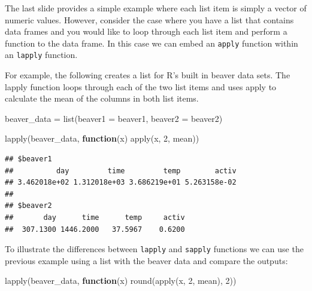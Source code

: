 \documentclass[
]{book}
\newenvironment{Shaded}{\begin{snugshade}}{\end{snugshade}}
\newcommand{\AttributeTok}[1]{\textcolor[rgb]{0.77,0.63,0.00}{#1}}
\newcommand{\ControlFlowTok}[1]{\textcolor[rgb]{0.13,0.29,0.53}{\textbf{#1}}}
\newcommand{\DecValTok}[1]{\textcolor[rgb]{0.00,0.00,0.81}{#1}}
\newcommand{\FunctionTok}[1]{\textcolor[rgb]{0.00,0.00,0.00}{#1}}
\newcommand{\NormalTok}[1]{#1}
\newcommand{\OtherTok}[1]{\textcolor[rgb]{0.56,0.35,0.01}{#1}}
\begin{document}
The last slide provides a simple example where each list item is simply a vector of numeric values. However, consider the case where you have a list that contains data frames and you would like to loop through each list item and perform a function to the data frame. In this case we can embed an \texttt{apply} function within an \texttt{lapply} function.

For example, the following creates a list for R's built in beaver data sets. The lapply function loops through each of the two list items and uses apply to calculate the mean of the columns in both list items.

\begin{Shaded}
\begin{Highlighting}[]
\NormalTok{beaver\_data }\OtherTok{=} \FunctionTok{list}\NormalTok{(}\AttributeTok{beaver1 =}\NormalTok{ beaver1, }
                    \AttributeTok{beaver2 =}\NormalTok{ beaver2)}
\end{Highlighting}
\end{Shaded}

\begin{Shaded}
\begin{Highlighting}[]
\FunctionTok{lapply}\NormalTok{(beaver\_data, }\ControlFlowTok{function}\NormalTok{(x) }\FunctionTok{apply}\NormalTok{(x, }\DecValTok{2}\NormalTok{, mean))}
\end{Highlighting}
\end{Shaded}

\begin{verbatim}
## $beaver1
##          day         time         temp        activ 
## 3.462018e+02 1.312018e+03 3.686219e+01 5.263158e-02 
## 
## $beaver2
##       day      time      temp     activ 
##  307.1300 1446.2000   37.5967    0.6200
\end{verbatim}

To illustrate the differences between \texttt{lapply} and \texttt{sapply} functions we can use the previous example using a list with the beaver data and compare the outputs:

\begin{Shaded}
\begin{Highlighting}[]
\FunctionTok{lapply}\NormalTok{(beaver\_data, }\ControlFlowTok{function}\NormalTok{(x) }\FunctionTok{round}\NormalTok{(}\FunctionTok{apply}\NormalTok{(x, }\DecValTok{2}\NormalTok{, mean), }\DecValTok{2}\NormalTok{))}
\end{Highlighting}
\end{Shaded}
\end{document}
